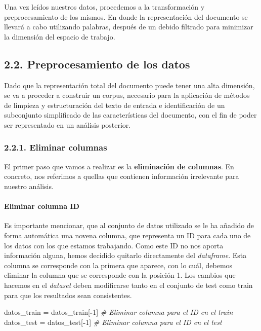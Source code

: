 \documentclass[spanish,]{article}
\newenvironment{Shaded}{\begin{snugshade}}{\end{snugshade}}
\newcommand{\DecValTok}[1]{\textcolor[rgb]{0.00,0.00,0.81}{#1}}
\newcommand{\StringTok}[1]{\textcolor[rgb]{0.31,0.60,0.02}{#1}}
\newcommand{\CommentTok}[1]{\textcolor[rgb]{0.56,0.35,0.01}{\textit{#1}}}
\newcommand{\OperatorTok}[1]{\textcolor[rgb]{0.81,0.36,0.00}{\textbf{#1}}}
\newcommand{\NormalTok}[1]{#1}
\let\oldparagraph\paragraph
\renewcommand{\paragraph}[1]{\oldparagraph{#1}\mbox{}}
\begin{document}
Una vez leídos nuestros datos, procedemos a la transformación y
preprocesamiento de los mismos. En donde la representación del documento
se llevará a cabo utilizando palabras, después de un debido filtrado
para minimizar la dimensión del espacio de trabajo.

\subsection{2.2. Preprocesamiento de los
datos}\label{preprocesamiento-de-los-datos}

Dado que la representación total del documento puede tener una alta
dimensión, se va a proceder a construir un corpus, necesario para la
aplicación de métodos de limpieza y estructuración del texto de entrada
e identificación de un subconjunto simplificado de las características
del documento, con el fin de poder ser representado en un análisis
posterior.

\subsubsection{2.2.1. Eliminar columnas}\label{eliminar-columnas}

El primer paso que vamos a realizar es la \textbf{eliminación de
columnas}. En concreto, nos referimos a quellas que contienen
información irrelevante para nuestro análisis.

\paragraph{Eliminar columna ID}\label{eliminar-columna-id}

Es importante mencionar, que al conjunto de datos utilizado se le ha
añadido de forma automática una novena columna, que representa un ID
para cada uno de los datos con los que estamos trabajando. Como este ID
no nos aporta información alguna, hemos decidido quitarlo directamente
del \emph{dataframe}. Esta columna se corresponde con la primera que
aparece, con lo cuál, debemos eliminar la columna que se corresponde con
la posición 1. Los cambios que hacemos en el \emph{dataset} deben
modificarse tanto en el conjunto de test como train para que los
resultados sean consistentes.

\begin{Shaded}
\begin{Highlighting}[]
\NormalTok{datos_train =}\StringTok{ }\NormalTok{datos_train[}\OperatorTok{-}\DecValTok{1}\NormalTok{] }\CommentTok{# Eliminar columna para el ID en el train}
\NormalTok{datos_test =}\StringTok{ }\NormalTok{datos_test[}\OperatorTok{-}\DecValTok{1}\NormalTok{] }\CommentTok{# Eliminar columna para el ID en el test}
\end{Highlighting}
\end{Shaded}
\end{document}
